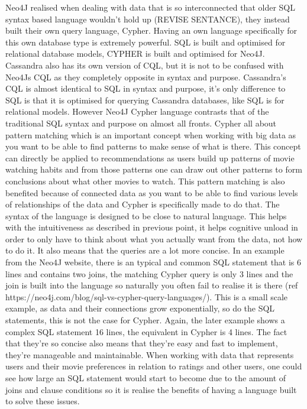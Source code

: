 \documentclass[a4paper]{article}
\begin{document}
Neo4J realised when dealing with data that is so interconnected that older SQL syntax based language wouldn't hold up (REVISE SENTANCE), they instead built their own query language, Cypher. Having an own language specifically for this own database type is extremely powerful. SQL is built and optimised for relational database models, CYPHER is built and optimised for Neo4J. Cassandra also has its own version of CQL, but it is not to be confused with Neo4Js CQL as they completely opposite in syntax and purpose. Cassandra's CQL is almost identical to SQL in syntax and purpose, it's only difference to SQL is that it is optimised for querying Cassandra databases, like SQL is for relational models. However Neo4J Cypher language contrasts that of the traditional SQL syntax and purpose on almost all fronts. Cypher all about pattern matching which is an important concept when working with big data as you want to be able to find patterns to make sense of what is there. This concept can directly be applied to recommendations as users build up patterns of movie watching habits and from those patterns one can draw out other patterns to form conclusions about what other movies to watch. This pattern matching is also benefited because of connected data as you want to be able to find various levels of relationships of the data and Cypher is specifically made to do that. The syntax of the language is designed to be close to natural language. This helps with the intuitiveness as described in previous point, it helps cognitive unload in order to only have to think about what you actually want from the data, not how to do it. It also means that the queries are a lot more concise. In an example from the Neo4J website, there is an typical and common SQL statement that is 6 lines and contains two joins, the matching Cypher query is only 3 lines and the join is built into the language so naturally you often fail to realise it is there (ref https://neo4j.com/blog/sql-vs-cypher-query-languages/). This is a small scale example, as data and their connections grow exponentially, so do the SQL statements, this is not the case for Cypher. Again, the later example shows a complex SQL statement 16 lines, the equivalent in Cypher is 4 lines. The fact that they're so concise also means that they're easy and fast to implement, they're manageable and maintainable. When working with data that represents users and their movie preferences in relation to ratings and other users, one could see how large an SQL statement would start to become due to the amount of joins and clause conditions so it is realise the benefits of having a language built to solve these issues. \par
\end{document}
